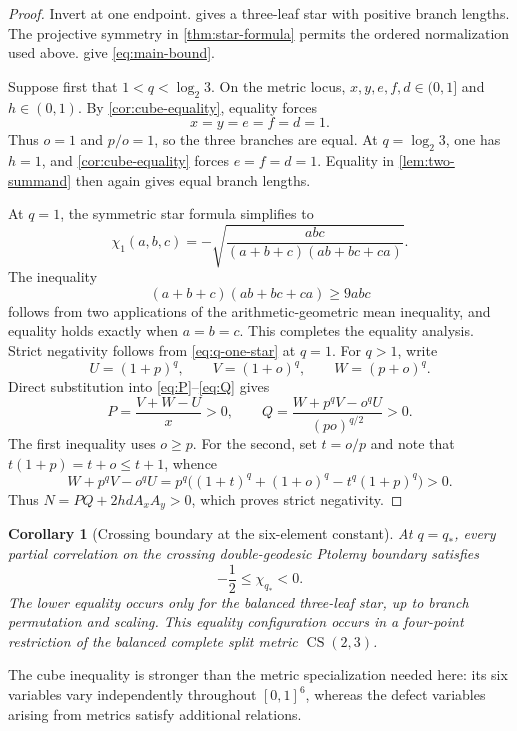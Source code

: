 \documentclass[11pt]{amsart}
\newtheorem{corollary}[corollary]{Corollary}
\theoremstyle{definition}
\theoremstyle{remark}
\newcommand{\CS}{\operatorname{CS}}
\newcommand{\qstar}{q_*}
\begin{document}
\begin{proof}
Invert at one endpoint.  gives a three-leaf
star with positive branch lengths. The projective symmetry in \cref{thm:star-formula} permits the ordered normalization used above.  give \eqref{eq:main-bound}.

Suppose first that \(1<q<\log_2 3\). On the metric locus,
$x,y,e,f,d\in(0,1]$ and $h\in(0,1)$. By
\cref{cor:cube-equality}, equality forces
\[
 x=y=e=f=d=1.
\]
Thus $o=1$ and $p/o=1$, so the three branches are equal. At
$q=\log_2 3$, one has $h=1$, and \cref{cor:cube-equality} forces
$e=f=d=1$. Equality in \cref{lem:two-summand} then again gives equal
branch lengths.

At \(q=1\), the symmetric star formula simplifies to
\begin{equation}\label{eq:q-one-star}
 \chi_1(a,b,c)
 =-\sqrt{\frac{abc}{(a+b+c)(ab+bc+ca)}}.
\end{equation}
The inequality
\[
 (a+b+c)(ab+bc+ca)\geq9abc
\]
follows from two applications of the arithmetic-geometric mean inequality,
and equality holds exactly when \(a=b=c\). This completes the equality
analysis. Strict negativity follows from \eqref{eq:q-one-star} at \(q=1\). For
\(q>1\), write
\[
 U=(1+p)^q,\qquad V=(1+o)^q,\qquad W=(p+o)^q.
\]
Direct substitution into \eqref{eq:P}--\eqref{eq:Q} gives
\[
 P=\frac{V+W-U}{x}>0,
 \qquad
 Q=\frac{W+p^qV-o^qU}{(po)^{q/2}}>0.
\]
The first inequality uses $o\ge p$. For the second, set $t=o/p$ and note
that $t(1+p)=t+o\le t+1$, whence
\[
 W+p^qV-o^qU
 =p^q\bigl((1+t)^q+(1+o)^q-t^q(1+p)^q\bigr)>0.
\]
Thus $N=PQ+2hdA_xA_y>0$, which proves strict negativity.
\end{proof}

\begin{corollary}[Crossing boundary at the six-element constant]\label{cor:qstar-boundary}
At \(q=\qstar\), every partial correlation on the crossing
double-geodesic Ptolemy boundary satisfies
\[
 -\frac12\leq\chi_{\qstar}<0.
\]
The lower equality occurs only for the balanced three-leaf star, up to branch permutation and scaling. This equality configuration occurs in a four-point restriction of the balanced complete split metric \(\CS(2,3)\).
\end{corollary}

The cube inequality is stronger than the metric specialization needed here: its six variables vary independently throughout $[0,1]^6$, whereas the defect variables arising from metrics satisfy additional relations.
\end{document}
